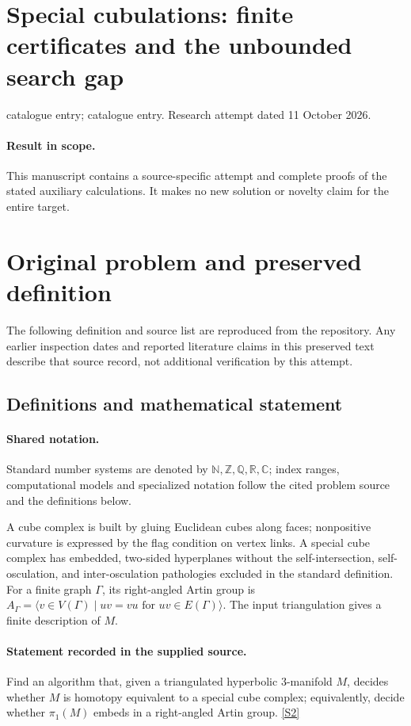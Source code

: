 \documentclass[11pt]{article}
\begin{document}
\section*{Special cubulations: finite certificates and the unbounded search gap}
\noindent catalogue entry; catalogue entry. Research attempt dated 11 October 2026.
\paragraph{Result in scope.}This manuscript contains a source-specific attempt and complete proofs of the stated auxiliary calculations. It makes no new solution or novelty claim for the entire target.
\section{Original problem and preserved definition}
The following definition and source list are reproduced from the repository. Any earlier inspection dates and reported literature claims in this preserved text describe that source record, not additional verification by this attempt.
\subsection{Definitions and mathematical statement}

\paragraph{Shared notation.}Standard number systems are denoted by $\mathbb N,\mathbb Z,\mathbb Q,\mathbb R,\mathbb C$; index ranges, computational models and specialized notation follow the cited problem source and the definitions below.


A cube complex is built by gluing Euclidean cubes along faces; nonpositive curvature is expressed by the flag condition on vertex links. A special cube complex has embedded, two-sided hyperplanes without the self-intersection, self-osculation, and inter-osculation pathologies excluded in the standard definition. For a finite graph $\Gamma$, its right-angled Artin group is $A_\Gamma=\langle v\in V(\Gamma)\mid uv=vu\text{ for }uv\in E(\Gamma)\rangle$. The input triangulation gives a finite description of $M$.
\paragraph{Statement recorded in the supplied source.}
Find an algorithm that, given a triangulated hyperbolic $3$-manifold $M$, decides whether $M$ is homotopy equivalent to a special cube complex; equivalently, decide whether $\pi_1(M)$ embeds in a right-angled Artin group. \href{https://doi.org/10.4171/owr/2020/8}{[S2]}
\end{document}
